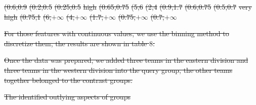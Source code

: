 \documentclass[
 size=14pt,
 paper=smartboard,  %
 mode=present, 		%
 display=slides, 	%
 style=tuliplab,  	%
 pauseslide,
 fleqn,leqno]{powerdot}
\providecommand{\DIFdeltex}[1]{{\protect\color{red}\sout{#1}}}                      %
\providecommand{\DIFdelFL}[1]{\DIFdel{#1}} %
\providecommand{\DIFdel}[1]{\texorpdfstring{\DIFdeltex{#1}}{}} %
\begin{document}
\DIFdelFL{(0.6,0.9}%
\DIFdelFL{(0.2,0.5}%
\DIFdelFL{(0.25,0.5}%
\DIFdelFL{high  }%
\DIFdelFL{(0.65,0.75}%
\DIFdelFL{(5,6}%
\DIFdelFL{(2,4}%
\DIFdelFL{(0.9,1.7}%
\DIFdelFL{(0.6,0.75}%
\DIFdelFL{(0.5,0.7}%
\DIFdelFL{very high}%
\DIFdelFL{(0.75,1}%
\DIFdelFL{(6,$+\infty$}%
\DIFdelFL{(4,$+\infty$}%
\DIFdelFL{(1.7,$+\infty$}%
\DIFdelFL{(0.75,$+\infty$}%
\DIFdelFL{(0.7,$+\infty$}%

\DIFdel{For those features with continuous values,
we use the binning method to discretize them,
the results are shown in table $8$.
}%

\DIFdel{Once the data was prepared,
we added three teams in the eastern division
and three teams in the western division into the query group,
the other teams together belonged to the contrast groups.
}%



{%
\DIFdelFL{The identified outlying aspects of groups}}
\end{document}
